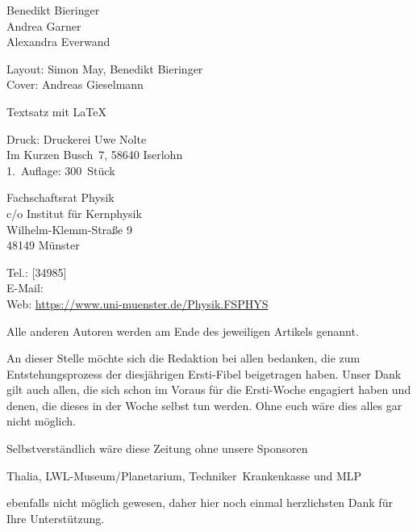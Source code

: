 \begin{multicols*}{2}
{\centering
	\vspace{-1ex}
	\vspace{-1ex}
	Benedikt Bieringer\\
	Andrea Garner\\
	Alexandra Everwand
	
	\footnotesize
	Layout: Simon May, Benedikt Bieringer\\
	Cover: Andreas Gieselmann
	
	Textsatz mit \LaTeX
	
	Druck: Druckerei Uwe Nolte\\
	Im Kurzen Busch~7, 58640 Iserlohn\\
	1.~Auflage: 300~Stück

	\vspace{-1ex}
	\vspace{-1ex}
	Fachschaftsrat Physik\\
	c/o Institut für Kernphysik\\
	Wilhelm-Klemm-Straße 9\\
	48149 Münster
	
	Tel.: [34985]\\
	E-Mail: \\
	Web: \url{https://www.uni-muenster.de/Physik.FSPHYS}
\par}

\footnotesize
Alle anderen Autoren werden am Ende des jeweiligen
Artikels genannt.

An dieser Stelle möchte sich die Redaktion bei allen bedanken, die zum Entstehungsprozess der diesjährigen Ersti-Fibel beigetragen haben.
%
Unser Dank gilt auch allen, die sich schon im Voraus für die Ersti-Woche engagiert haben und denen, die dieses in der Woche selbst tun werden.
Ohne euch wäre dies alles gar nicht möglich.

Selbstverständlich wäre diese Zeitung ohne unsere Sponsoren
\begin{center}
	Thalia, LWL-Museum/Planetarium, Techniker~Krankenkasse und MLP
\end{center}
ebenfalls nicht möglich gewesen, daher hier noch einmal herzlichsten Dank für Ihre Unterstützung.
\end{multicols*}

